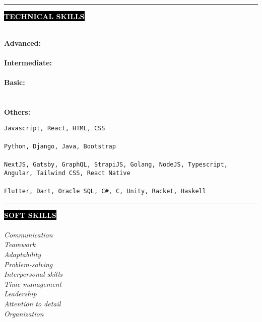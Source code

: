\documentclass[11pt,A4]{article}
\newcounter{a}
\newcounter{b}
\newcounter{c}
\newcommand{\cvsection}[1] {
	\textcolor{white}{\MakeUppercase{\textbf{#1}}}
}
\newcommand{\cvsect}[1]{
	\colorbox{black}{{\cvsection{#1}}}\\\\%
}
\begin{document}
	\\
	\begin{minipage}[t]{.8\textwidth}\hrule height 0pt width 0pt%
	\cvsect{Technical Skills}
	\begin{minipage}[t]{0.22\textwidth}
		\textbf{Advanced: }\\ \\
		\textbf{Intermediate: }\\ \\
		\textbf{Basic: } \\ \\ \\
		\textbf{Others: }
	\end{minipage}
	\begin{minipage}[t]{.8\textwidth}%
		\texttt{Javascript, React, HTML, CSS} \\ \\
		\texttt{Python, Django, Java, Bootstrap} \\ \\
		\texttt{NextJS, Gatsby, GraphQL, StrapiJS, Golang, NodeJS, Typescript, Angular, Tailwind CSS, React Native} \\ \\
		\texttt{Flutter, Dart, Oracle SQL, C\#, C, Unity, Racket, Haskell}
	\end{minipage}%
	\end{minipage}
	\hspace{.2cm}
		\begin{minipage}[t]{0.3\textwidth}\hrule height 0pt width 0pt%
		\cvsect{Soft skills}
		\textit{Communication}\\
		\textit{Teamwork}\\
		\textit{Adaptability}\\
		\textit{Problem-solving}\\
		\textit{Interpersonal skills}\\
		\textit{Time management}\\
		\textit{Leadership}\\
		\textit{Attention to detail}\\
		\textit{Organization}
	\end{minipage}%
\end{document}
